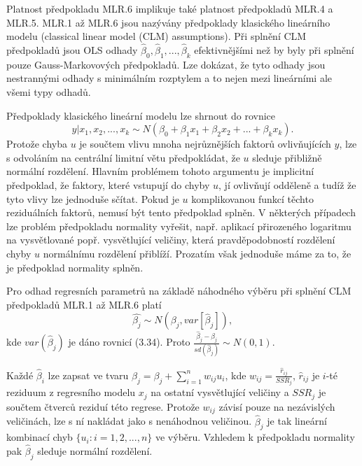 Platnost předpokladu MLR.6 implikuje také platnost předpokladů MLR.4 a MLR.5. MLR.1 až MLR.6 jsou nazývány předpoklady klasického 
lineárního modelu (classical linear model (CLM) assumptions). Při splnění CLM předpokladů jsou OLS odhady $\hat{\beta}_0, 
\hat{\beta}_1, ..., \hat{\beta}_k$ efektivnějšími než by byly při splnění pouze Gauss-Markovových předpokladů. Lze dokázat, že tyto odhady 
jsou nestrannými odhady s minimálním rozptylem a to nejen mezi lineárními ale všemi typy odhadů.

Předpoklady klasického lineární modelu lze shrnout do rovnice
\begin{equation}
y|x_1, x_2, ..., x_k \sim N(\beta_0 + \beta_1 x_1 + \beta_2 x_2 + ... + \beta_k x_k).
\end{equation}
Protože chyba $u$ je součtem vlivu mnoha nejrůznějších faktorů ovlivňujících $y$, lze s odvoláním na centrální limitní větu 
předpokládat, že $u$ sleduje přibližně normální rozdělení. Hlavním problémem tohoto argumentu je implicitní předpoklad, že faktory, které 
vstupují do chyby $u$, jí ovlivňují odděleně a tudíž že tyto vlivy lze jednoduše sčítat. Pokud je $u$ komplikovanou funkcí těchto 
reziduálních faktorů, nemusí být tento předpoklad splněn. V některých případech lze problém předpokladu normality vyřešit, např. 
aplikací přirozeného logaritmu na vysvětlované popř. vysvětlující veličiny, která pravděpodobností rozdělení chyby $u$ normálnímu 
rozdělení přiblíží. Prozatím však jednoduše máme za to, že je předpoklad normality splněn.
\begin{theorem}
Pro odhad regresních parametrů na základě náhodného výběru při splnění CLM předpokladů MLR.1 až MLR.6 platí
\begin{equation}
\hat{\beta_j} \sim N(\beta_j, var[\hat{\beta}_j]),
\end{equation}
kde $var(\hat{\beta}_j)$ je dáno rovnicí (3.34). Proto $\frac{\hat{\beta}_j - \beta_j}{sd(\hat{\beta}_j)} \sim N(0, 1)$.

\raggedleft{$\clubsuit$}
\end{theorem}
Každé $\hat{\beta}_i$ lze zapsat ve tvaru $\hat{\beta}_j = \beta_j + \sum_{i = 1}^n w_{ij}u_i$, kde $w_{ij} = \frac{\hat{r}_{ij}}{SSR_j}$,
$\hat{r}_{ij}$ je $i$-té reziduum z regresního modelu $x_j$ na ostatní vysvětlující veličiny a $SSR_j$ je součtem čtverců reziduí této 
regrese. Protože $w_{ij}$ závisí pouze na nezávislých veličinách, lze s ní nakládat jako s nenáhodnou veličinou. $\hat{\beta}_j$ je tak lineární 
kombinací chyb $\{u_i: i = 1, 2, ..., n\}$ ve výběru. Vzhledem k předpokladu normality pak $\hat{\beta}_j$ sleduje normální rozdělení.

